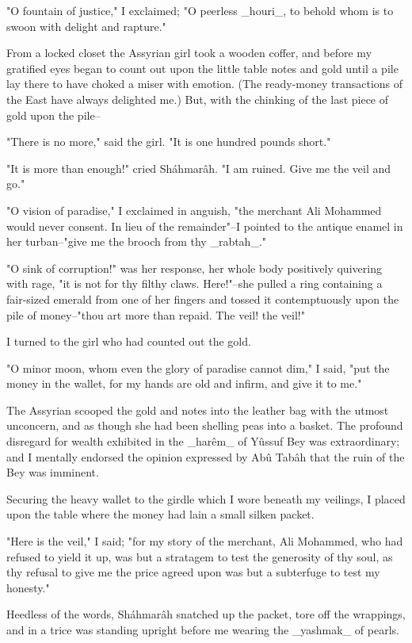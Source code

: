 "O fountain of justice," I exclaimed; "O peerless _houri_, to behold
whom is to swoon with delight and rapture."

From a locked closet the Assyrian girl took a wooden coffer, and
before my gratified eyes began to count out upon the little table
notes and gold until a pile lay there to have choked a miser with
emotion. (The ready-money transactions of the East have always
delighted me.) But, with the chinking of the last piece of gold upon
the pile--

"There is no more," said the girl. "It is one hundred pounds short."

"It is more than enough!" cried Sháhmarâh. "I am ruined. Give me the
veil and go."

"O vision of paradise," I exclaimed in anguish, "the merchant Ali
Mohammed would never consent. In lieu of the remainder"--I pointed to
the antique enamel in her turban--"give me the brooch from thy
_rabtah_."

"O sink of corruption!" was her response, her whole body positively
quivering with rage, "it is not for thy filthy claws. Here!"--she
pulled a ring containing a fair-sized emerald from one of her fingers
and tossed it contemptuously upon the pile of money--"thou art more
than repaid. The veil! the veil!"

I turned to the girl who had counted out the gold.

"O minor moon, whom even the glory of paradise cannot dim," I said,
"put the money in the wallet, for my hands are old and infirm, and
give it to me."

The Assyrian scooped the gold and notes into the leather bag with
the utmost unconcern, and as though she had been shelling peas into
a basket. The profound disregard for wealth exhibited in the _harêm_
of Yûssuf Bey was extraordinary; and I mentally endorsed the opinion
expressed by Abû Tabâh that the ruin of the Bey was imminent.

Securing the heavy wallet to the girdle which I wore beneath my
veilings, I placed upon the table where the money had lain a small
silken packet.

"Here is the veil," I said; "for my story of the merchant, Ali
Mohammed, who had refused to yield it up, was but a stratagem to
test the generosity of thy soul, as thy refusal to give me the
price agreed upon was but a subterfuge to test my honesty."

Heedless of the words, Sháhmarâh snatched up the packet, tore off the
wrappings, and in a trice was standing upright before me wearing the
_yashmak_ of pearls.

